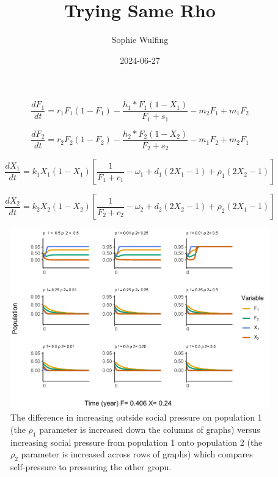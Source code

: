 \documentclass[
]{article}
\title{Trying Same Rho}
\author{Sophie Wulfing}
\date{2024-06-27}
\begin{document}
\maketitle

\begin{equation}
\frac{dF_1}{dt} = r_1F_1(1-F_1)-\frac{h_1*F_1(1-X_1)}{F_1 + s_1} -m_2F_1 + m_1F_2
  \label{eq:FishWhole1}
\end{equation}

\begin{equation}
\frac{dF_2}{dt} = r_2F_2(1-F_2)-\frac{h_2*F_2(1-X_2)}{F_2 + s_2} -m_1F_2 + m_2F_1
  \label{eq:FishWhole2}
\end{equation}

\begin{equation}
\frac{dX_1}{dt} =  k_1X_1(1-X_1) [\frac{1}{F_1+c_1} - \omega_1 + d_1(2X_1 - 1) + \rho_1(2X_2 - 1)]
  \label{eq:SocWhole1}
\end{equation}

\begin{equation}
\frac{dX_2}{dt} = k_2X_2(1-X_2)  [\frac{1}{F_2+c_2} - \omega_2 + d_2(2X_2 - 1) +  \rho_2(2X_1 - 1)]
  \label{eq:SocWhole2}
\end{equation}



\begin{figure}
\centering
\includegraphics{BothRhos_files/figure-latex/influenceAsym-1.pdf}
\caption{\label{fig:influenceAsym}The difference in increasing outside social pressure on population 1 (the \(\rho_1\) parameter is increased down the columns of graphs) versus increasing social pressure from population 1 onto population 2 (the \(\rho_2\) parameter is increased across rows of graphs) which compares self-pressure to pressuring the other gropu. \label{influenceAsym}}
\end{figure}
\end{document}
